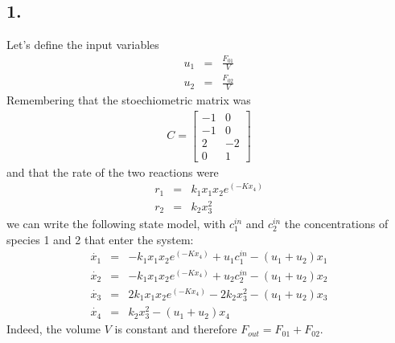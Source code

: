 \subsection*{1.}
Let's define the input variables
\begin{eqnarray*}
u_1 &=& \frac{F_{01}}{V}\\
u_2 &=& \frac{F_{02}}{V}
\end{eqnarray*}
Remembering that the stoechiometric matrix was
\begin{eqnarray*}
C = \begin{bmatrix}
-1 & 0 \\
-1 & 0 \\
2 & -2 \\
0 & 1
\end{bmatrix}
\end{eqnarray*}
and that the rate of the two reactions were
\begin{eqnarray*}
r_1 &=& k_1x_1x_2e^{(-Kx_4)}\\
r_2 &=& k_2x_3^2
\end{eqnarray*}
we can write the following state model, with $c_1^{in}$ and $c_2^{in}$ the concentrations of species 1 and 2 that enter the system:
\begin{eqnarray*}
\dot{x_1} &=& -k_1x_1x_2e^{(-Kx_4)} + u_1 c_1^{in} - (u_1+u_2)x_1 \\
\dot{x_2} &=& -k_1x_1x_2e^{(-Kx_4)} + u_2 c_2^{in} - (u_1+u_2)x_2 \\
\dot{x_3} &=& 2k_1x_1x_2e^{(-Kx_4)} - 2k_2x_3^2 - (u_1+u_2)x_3 \\
\dot{x_4} &=& k_2x_3^2 - (u_1+u_2)x_4
\end{eqnarray*}
Indeed, the volume $V$ is constant and therefore $F_{out} = F_{01} + F_{02}$.

